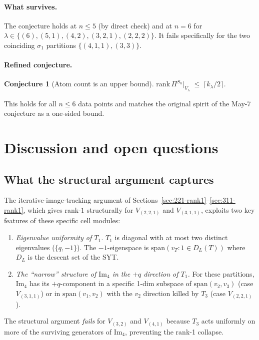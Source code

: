 \documentclass[11pt]{article}
\newtheorem{conjecture}[theorem]{Conjecture}
\theoremstyle{definition}
\begin{document}
\paragraph{What survives.} The conjecture holds at $n \leq 5$
(by direct check) and at $n=6$ for $\lambda \in \{(6), (5,1), (4,2),
(3,2,1), (2,2,2)\}$. It fails specifically for the two coinciding
$\sigma_1$ partitions $\{(4,1,1), (3,3)\}$.

\paragraph{Refined conjecture.}
\begin{conjecture}[Atom count is an upper bound]\label{conj:atom-bound}
$\mathrm{rank}\,\Pi^{S_n}|_{V_\lambda}\;\leq\;\lceil k_\lambda / 2 \rceil$.
\end{conjecture}
This holds for all $n \leq 6$ data points and matches the original
spirit of the May-7 conjecture as a one-sided bound.

\section{Discussion and open questions}\label{sec:open}

\subsection{What the structural argument captures}

The iterative-image-tracking argument of
Sections~\ref{sec:221-rank1}--\ref{sec:311-rank1}, which gives
rank-$1$ structurally for $V_{(2,2,1)}$ and $V_{(3,1,1)}$, exploits
two key features of these specific cell modules:
\begin{enumerate}[leftmargin=2em,topsep=0.3em,itemsep=0.2em]
\item \emph{Eigenvalue uniformity of $T_1$.}
$T_1$ is diagonal with at most two distinct eigenvalues
($\{q, -1\}$). The $-1$-eigenspace is $\mathrm{span}(v_T : 1 \in D_L(T))$
where $D_L$ is the descent set of the SYT.
\item \emph{The ``narrow'' structure of $\mathrm{Im}_4$ in the $+q$
direction of $T_1$.} For these partitions, $\mathrm{Im}_4$ has
its $+q$-component in a specific 1-dim subspace of
$\mathrm{span}(v_2, v_3)$ (case $V_{(3,1,1)}$) or in
$\mathrm{span}(v_1, v_2)$ with the $v_2$ direction killed by $T_3$
(case $V_{(2,2,1)}$).
\end{enumerate}

The structural argument \emph{fails} for $V_{(3,2)}$ and $V_{(4,1)}$
because $T_3$ acts uniformly on more of the surviving generators of
$\mathrm{Im}_4$, preventing the rank-1 collapse.
\end{document}

